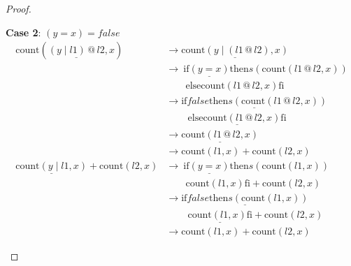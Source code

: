 \documentclass[12pt, a4paper]{article}
\newcommand{\rel}[1]{\mathrel{#1}}
\newcommand{\rmx}[1]{\mathrm{#1}}
\newcommand{\larrow}{\longrightarrow}
\newcommand{\under}{\underline}
\begin{document}
\begin{proof}
\begin{description}
\textbf{Case 2}: $(y = x) = false$
\begin{align*}
\rmx{count}(\under{(y \mid l1) \rel{@} l2}, x)
	&\larrow \under{\rmx{count}(y \mid (l1 \rel{@} l2), x)} \tag{by @2} \\
	&\larrow\ \rel{\rmx{if}} \under{(y = x)} \rel{\rmx{then}} s(\rmx{count}(l1 \rel{@} l2, x)) \\
	&\quad \quad \rel{\rmx{else}} \rmx{count}(l1 \rel{@} l2, x) \rel{\rmx{fi}} \tag{by cnt2} \\
	&\larrow \under{\rel{\rmx{if}} false \rel{\rmx{then}} s(\rmx{count}(l1 \rel{@} l2, x))} \\
	&\quad \quad\ \under{\rel{\rmx{else}} \rmx{count}(l1 \rel{@} l2, x) \rel{\rmx{fi}}} \tag{by case splitting} \\
	&\larrow \under{\rmx{count}(l1 \rel{@} l2, x)} \tag{by if2} \\
	&\larrow \rmx{count}(l1, x) + \rmx{count}(l2, x) \tag{by IH} \\
\under{\rmx{count}(y \mid l1, x)} + \rmx{count}(l2, x)
	&\larrow\ \rel{\rmx{if}} \under{(y = x)} \rel{\rmx{then}} s(\rmx{count}(l1, x)) \\
	&\quad \quad \rmx{count}(l1, x) \rel{\rmx{fi}} + \rmx{count}(l2, x) \tag{by cnt2} \\
	&\larrow \under{\rel{\rmx{if}} false \rel{\rmx{then}} s(\rmx{count}(l1, x))} \\
	&\quad \quad\ \under{\rmx{count}(l1, x) \rel{\rmx{fi}}} + \rmx{count}(l2, x) \tag{by case splitting} \\
	&\larrow \rmx{count}(l1, x) + \rmx{count}(l2, x) \tag{by if2}
\end{align*}
\end{description}
\end{proof}
\end{document}

